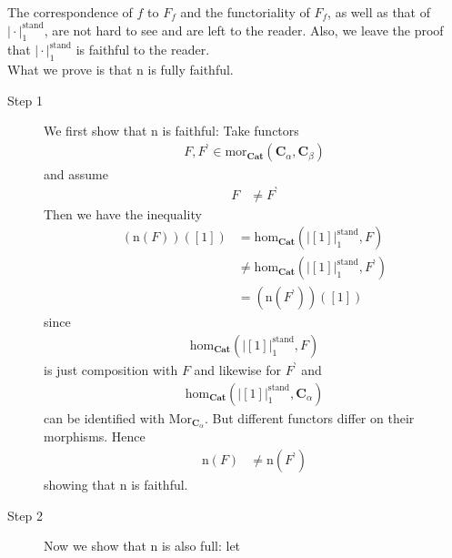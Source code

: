 \begin{prf}
The correspondence of $f$ to $F_{f}$ and the functoriality of $F_{f}$, as well as that of $\vert \cdot \vert_{1}^{\textrm{stand}}$, are not hard to see and are left to the reader.
Also, we leave the proof that $\vert \cdot \vert_{1}^{\textrm{stand}}$ is faithful to the reader.
\\
What we prove is that $\mathrm{n}$ is fully faithful.
\begin{description}
\item[Step 1]
We first show that $\mathrm{n}$ is faithful: Take functors
\begin{align*}
  F,
  F^{\backprime}
  \in
  \mathrm{mor}_{\mathbf{Cat}}
  \left(
    \mathbf{C}_{\alpha},
    \mathbf{C}_{\beta}
  \right)
\end{align*}
and assume
\begin{align*}
  F
  &\neq
  F^{\backprime}
\end{align*}
Then we have the inequality
\begin{align*}
  (\mathrm{n}(F))
  \left(
    [1]
  \right)
  &=
  \mathrm{hom}_{\mathbf{Cat}}
  \left(
    \left\vert
      [1]
    \right\vert_{1}^{\textrm{stand}},
    F
  \right)
  \\
  &\neq
  \mathrm{hom}_{\mathbf{Cat}}
  \left(
    \left\vert
      [1]
    \right\vert_{1}^{\textrm{stand}},
    F^{\backprime}
  \right)
  \\
  &=
  \left(
    \mathrm{n}(F^{\backprime})
  \right)
  \left(
    [1]
  \right)
\end{align*}
since
\begin{align*}
  \mathrm{hom}_{\mathbf{Cat}}
  \left(
    \left\vert
      [1]
    \right\vert_{1}^{\textrm{stand}},
    F
  \right)
\end{align*}
is just composition with $F$ and likewise for $F^{\backprime}$ and
\begin{align*}
  \mathrm{hom}_{\mathbf{Cat}}
  \left(
    \left\vert
      [1]
    \right\vert_{1}^{\textrm{stand}},
    \mathbf{C}_{\alpha}
  \right)
\end{align*}
can be identified with $\mathrm{Mor}_{\mathbf{C}_{\alpha}}$.
But different functors differ on their morphisms.
Hence
\begin{align*}
  \mathrm{n}(F)
  &\neq
  \mathrm{n}
  \left(
    F^{\backprime}
  \right)
\end{align*}
showing that $\mathrm{n}$ is faithful.
\item[Step 2]
Now we show that $\mathrm{n}$ is also full: let
\begin{align*}

\end{align*}
\end{description}
\end{prf}
